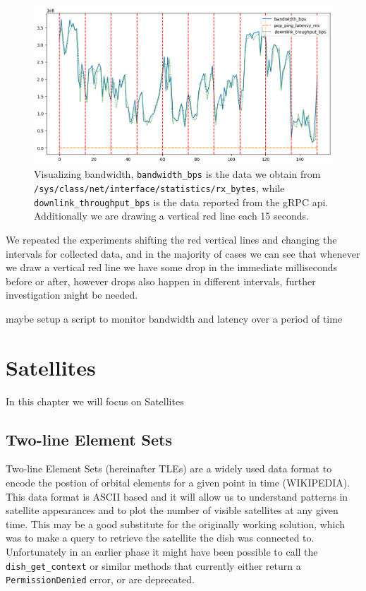 \documentclass[IN,11pt,twoside,openright,bachelor,english]{tumthesis}
\begin{document}
\begin{figure}
	\label{fig:vis-bw-15sec}
	\centering
	\includegraphics[width=1\columnwidth]{img/bw-15seconds.png}
	\caption{Visualizing bandwidth, \texttt{bandwidth\_bps} is the data we obtain from \texttt{/sys/class/net/{interface}/statistics/rx\_bytes}, while \texttt{downlink\_throughput\_bps} is the data reported from the gRPC api. Additionally we are drawing a vertical red line each 15 seconds.}
\end{figure}

We repeated the experiments shifting the red vertical lines and changing the intervals for collected data, and in the majority of cases we can see that whenever we draw a vertical red line we have some drop in the immediate milliseconds before or after, however drops also happen in different intervals, further investigation might be needed.




maybe setup a script to monitor bandwidth and latency over a period of time


\chapter{Satellites}
\label{chap:sats}
In this chapter we will focus on Satellites
\section{Two-line Element Sets}
Two-line Element Sets (hereinafter TLEs) are a widely used data format to encode the postion of orbital elements for a given point in time (WIKIPEDIA). This data format is ASCII based and it will allow us to understand patterns in satellite appearances and to plot the number of visible satellites at any given time. This may be a good substitute for the originally working solution, which was to make a query to retrieve the satellite the dish was connected to. Unfortunately in an earlier phase it might have been possible to call the \texttt{dish\_get\_context} or similar methods that currently either return a \texttt{PermissionDenied} error, or are deprecated.
\end{document}
